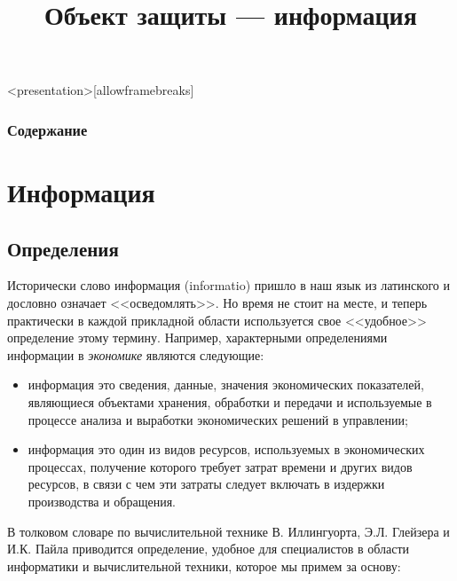
\title[Объект защиты --- информация]{Объект защиты --- информация}






\begin{frame}<presentation>[allowframebreaks]
    \frametitle{Содержание}
    \tableofcontents
\end{frame}


\section{Информация}


\subsection{Определения}


Исторически слово информация (informatio) пришло в наш язык из латинского и дословно означает <<осведомлять>>. Но время не стоит на месте, и теперь практически в каждой прикладной области используется свое <<удобное>> определение этому термину.
Например, характерными определениями информации в \emph{экономике} являются следующие:
\begin{itemize}
    \item информация это сведения, данные, значения экономических показателей, являющиеся объектами хранения, обработки и передачи и используемые в процессе анализа и выработки экономических решений в управлении; 
    \item информация это один из видов ресурсов, используемых в экономических процессах, получение которого требует затрат времени и других видов ресурсов, в связи с чем эти затраты следует включать в издержки производства и обращения. 
\end{itemize}

В толковом словаре по вычислительной технике В. Иллингуорта, Э.Л. Глейзера и И.К. Пайла приводится определение, удобное для специалистов в области информатики и вычислительной техники, которое мы примем за основу: 


